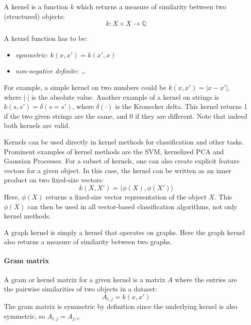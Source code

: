 A kernel is a function $k$ which returns a measure of similarity between two (structured) objects:
\begin{equation*}
k: X \times X \rightarrow \mathbb{Q}
\end{equation*}

A kernel function has to be:
\begin{itemize}
    \item{\textit{symmetric}: $k(x, x') = k(x', x)$}
    \item{\textit{non-negative definite}: \dots}
\end{itemize}

For example, a simple kernel on two numbers could be $k(x, x') = | x - x' |$, where $| \cdot |$ is the absolute value.
Another example of a kernel on strings is $k(s, s') = \delta(s = s')$, where $\delta(\cdot)$ is the Kronecker delta. This kernel returns 1 if the two given strings are the same, and 0 if they are different.
Note that indeed both kernels are valid.

Kernels can be used directly in kernel methods for classification and other tasks.
Prominent examples of kernel methods are the SVM, kernelized PCA and Gaussian Processes. For a subset of kernels, one can also create explicit feature vectors for a given object. In this case, the kernel can be written as an inner product on two fixed-size vectors:
\begin{equation*}
    k(X, X') = \langle \phi(X), \phi(X') \rangle
\end{equation*}
Here, $\phi(X)$ returns a fixed-size vector representation of the object $X$.
This $\phi(X)$ can then be used in all vector-based classification algorithms, not only kernel methods.

A graph kernel is simply a kernel that operates on graphs. Here the graph kernel also returns a measure of similarity between two graphs.


\paragraph{Gram matrix}
A gram or kernel matrix for a given kernel is a matrix $A$ where the entries are the pairwise similarities of two objects in a dataset:
\begin{equation*}
    A_{i,j} = k(x, x')
\end{equation*}
The gram matrix is symmetric by definition since the underlying kernel is also symmetric, so $A_{i,j} = A_{j, i}$.

